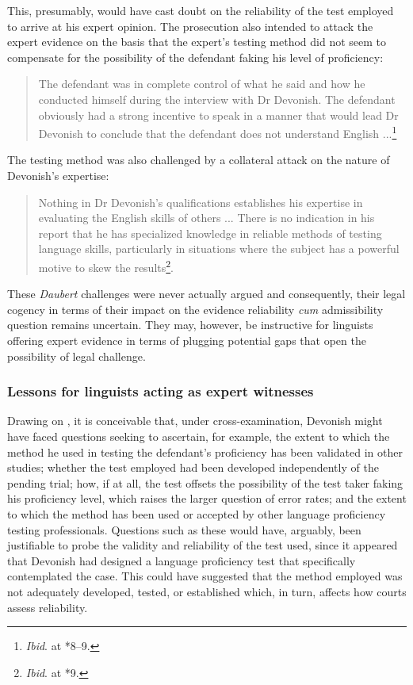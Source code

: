 \documentclass[output=paper,colorlinks,citecolor=brown]{langscibook}
\begin{document}
This, presumably, would have cast doubt on the reliability of the test employed to arrive at his expert opinion. The prosecution also intended to attack the expert evidence on the basis that the expert’s testing method did not seem to compensate for the possibility of the defendant faking his level of proficiency:

\begin{quote}
    The defendant was in complete control of what he said and how he conducted himself during the interview with Dr Devonish.  The defendant obviously had a strong incentive to speak in a manner that would lead Dr Devonish to conclude that the defendant does not understand English ...\footnote{\emph{Ibid}. at *8--9.}
\end{quote}

The testing method was also challenged by a collateral attack on the nature of Devonish’s expertise:

\begin{quote}
    Nothing in Dr Devonish’s qualifications establishes his expertise in evaluating the English skills of others ... There is no indication in his report that he has specialized knowledge in reliable methods of testing language skills, particularly in situations where the subject has a powerful motive to skew the results\footnote{\emph{Ibid}. at *9.}.
\end{quote}
 
These \emph{Daubert} challenges were never actually argued and consequently, their legal cogency in terms of their impact on the evidence reliability \textit{cum} admissibility question remains uncertain. They may, however, be instructive for linguists offering expert evidence in terms of plugging potential gaps that open the possibility of legal challenge.  

\subsubsection{Lessons for linguists acting as expert witnesses}

Drawing on \citet{Meintjes-vanderWalt2019}, it is conceivable that, under cross-examination, Devonish might have faced questions seeking to ascertain, for example, the extent to which the method he used in testing the defendant’s proficiency has been validated in other studies; whether the test employed had been developed independently of the pending trial; how, if at all, the test offsets the possibility of the test taker faking his proficiency level, which raises the larger question of error rates; and the extent to which the method has been used or accepted by other language proficiency testing professionals. Questions such as these would have, arguably, been justifiable to probe the validity and reliability of the test used, since it appeared that Devonish had designed a language proficiency test that specifically contemplated the case.  This could have suggested that the method employed was not adequately developed, tested, or established which, in turn, affects how courts assess reliability. 
\end{document}
